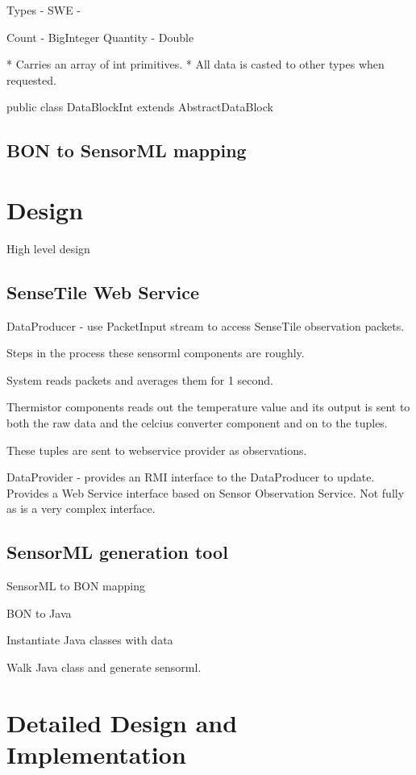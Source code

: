 \documentclass[]{final_report}
\begin{document}
Types
 - SWE -

Count - BigInteger
Quantity - Double

 * Carries an array of int primitives.
 * All data is casted to other types when requested.

public class DataBlockInt extends AbstractDataBlock


\newpage
\section{BON to SensorML mapping}

\chapter{Design}
High level design
\section{SenseTile Web Service}

DataProducer - use PacketInput stream to access SenseTile observation packets.

Steps in the process these sensorml components are roughly.

System reads packets and averages them for 1 second.

Thermistor components reads out the temperature value
and its output is sent to both the raw data and the celcius
converter component and on to the tuples.

These tuples are sent to webservice provider as observations.


DataProvider - provides an RMI interface to the DataProducer to update. Provides a Web Service interface  based on Sensor Observation Service. Not fully as is a very complex interface.

\section{SensorML generation tool}

SensorML to BON mapping

BON to Java

Instantiate Java classes with data

Walk Java class and generate sensorml.



\chapter{ Detailed Design and Implementation}
\end{document}
